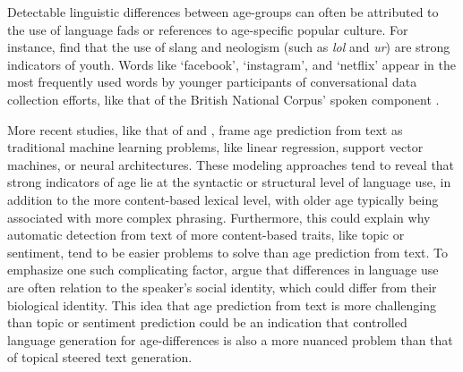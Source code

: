 Detectable linguistic differences between age-groups can often be attributed to the use of language fads or references to age-specific popular culture. For instance, \cite{schler2006effects} find that the use of slang and neologism (such as \textit{lol} and \textit{ur}) are strong indicators of youth. Words like `facebook', `instagram', and `netflix' appear in the most frequently used words by younger participants of conversational data collection efforts, like that of the British National Corpus' spoken component \citep{love-spoken-bnc-2014}.

More recent studies, like that of \cite{nguyen-etal-2011-author} and \cite{abdallah2020age}, frame age prediction from text as traditional machine learning problems, like linear regression, support vector machines, or neural architectures. These modeling approaches tend to reveal that strong indicators of age lie at the syntactic or structural level of language use, in addition to the more content-based lexical level, with older age typically being associated with more complex phrasing. Furthermore, this could explain why automatic detection from text of more content-based traits, like topic or sentiment, tend to be easier problems to solve than age prediction from text. To emphasize one such complicating factor, \cite{nguyen2014gender} argue that differences in language use are often relation to the speaker's social identity, which could differ from their biological identity. This idea that age prediction from text is more challenging than topic or sentiment prediction could be an indication that controlled language generation for age-differences is also a more nuanced problem than that of topical steered text generation.


